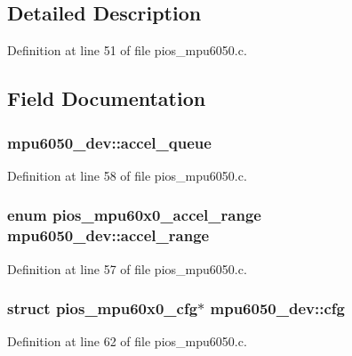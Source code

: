\subsection{Detailed Description}


Definition at line 51 of file pios\-\_\-mpu6050.\-c.



\subsection{Field Documentation}
\hypertarget{structmpu6050__dev_a59bba40f73e989c812d988c7c1e8a8bc}{
\subsubsection[{accel\-\_\-queue}]{ mpu6050\-\_\-dev\-::accel\-\_\-queue}}\label{structmpu6050__dev_a59bba40f73e989c812d988c7c1e8a8bc}


Definition at line 58 of file pios\-\_\-mpu6050.\-c.

\hypertarget{structmpu6050__dev_a4733a0f3b1d592d6858902c3f12cf3b2}{
\subsubsection[{accel\-\_\-range}]{\setlength{\rightskip}{0pt plus 5cm}enum {\bf pios\-\_\-mpu60x0\-\_\-accel\-\_\-range} mpu6050\-\_\-dev\-::accel\-\_\-range}}\label{structmpu6050__dev_a4733a0f3b1d592d6858902c3f12cf3b2}


Definition at line 57 of file pios\-\_\-mpu6050.\-c.

\hypertarget{structmpu6050__dev_ac1b0d1da5fdfa6488dd23aa964573496}{
\subsubsection[{cfg}]{\setlength{\rightskip}{0pt plus 5cm}struct {\bf pios\-\_\-mpu60x0\-\_\-cfg}$\ast$ mpu6050\-\_\-dev\-::cfg}}\label{structmpu6050__dev_ac1b0d1da5fdfa6488dd23aa964573496}


Definition at line 62 of file pios\-\_\-mpu6050.\-c.

